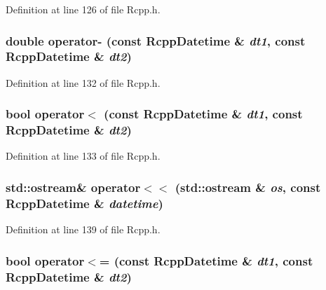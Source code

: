 Definition at line 126 of file Rcpp.h.\hypertarget{classRcppDatetime_a946df17f9ce3c423518d0db74e2bbbc4}{
\subsubsection[{operator-\/}]{\setlength{\rightskip}{0pt plus 5cm}double operator-\/ (const {\bf RcppDatetime} \& {\em dt1}, \/  const {\bf RcppDatetime} \& {\em dt2})}}
\label{classRcppDatetime_a946df17f9ce3c423518d0db74e2bbbc4}


Definition at line 132 of file Rcpp.h.\hypertarget{classRcppDatetime_a142f9346629bf7a6f673ba05d9338cf3}{
\subsubsection[{operator$<$}]{\setlength{\rightskip}{0pt plus 5cm}bool operator$<$ (const {\bf RcppDatetime} \& {\em dt1}, \/  const {\bf RcppDatetime} \& {\em dt2})}}
\label{classRcppDatetime_a142f9346629bf7a6f673ba05d9338cf3}


Definition at line 133 of file Rcpp.h.\hypertarget{classRcppDatetime_a778b21a52b7f2b17978933c3ec27754e}{
\subsubsection[{operator$<$$<$}]{\setlength{\rightskip}{0pt plus 5cm}std::ostream\& operator$<$$<$ (std::ostream \& {\em os}, \/  const {\bf RcppDatetime} \& {\em datetime})}}
\label{classRcppDatetime_a778b21a52b7f2b17978933c3ec27754e}


Definition at line 139 of file Rcpp.h.\hypertarget{classRcppDatetime_a7d98733f95f5647ac10bb8236c1a7a8d}{
\subsubsection[{operator$<$=}]{\setlength{\rightskip}{0pt plus 5cm}bool operator$<$= (const {\bf RcppDatetime} \& {\em dt1}, \/  const {\bf RcppDatetime} \& {\em dt2})}}
\label{classRcppDatetime_a7d98733f95f5647ac10bb8236c1a7a8d}


